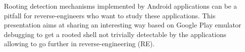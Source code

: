 \def\abstracttitle{Android\_Emuroot: Abusing Google Play emulator debugging to RE non-cooperative apps as root}
\def\abstractcomment{Short Talk}
\def\abstractowner{anais}

\thispagestyle{abstract}

Rooting detection mechanisms implemented by Android applications can be a pitfall for reverse-engineers who want to study these applications. This presentation aims at sharing an interesting way based on Google Play emulator debugging to get a rooted shell not trivially detectable by the applications allowing to go further in reverse-engineering (RE).
